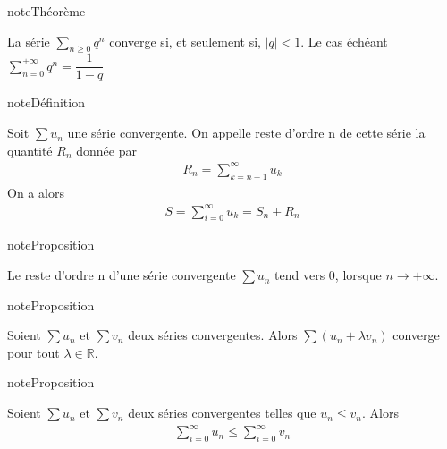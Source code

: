 \documentclass[letterpaper,10pt,french]{sphinxmanual}
\begin{document}
\begin{sphinxadmonition}{note}{Théorème}

\sphinxAtStartPar
La série \(\sum_{n\geq 0}q^n\) converge si, et seulement si, \(|q|<1\). Le cas échéant \(\sum_{n= 0}^{+\infty}q^n=\dfrac{1}{1-q}\)
\end{sphinxadmonition}

\begin{sphinxadmonition}{note}{Définition}

\sphinxAtStartPar
Soit \(\sum u_n\) une série convergente. On appelle reste d’ordre n de cette série
la quantité \(R_n\) donnée par
\begin{equation*}
\begin{split}
R_n = \sum_{k=n+1}^{\infty}u_k
\end{split}
\end{equation*}
\sphinxAtStartPar
On a alors
\begin{equation*}
\begin{split}
S= \sum_{i=0}^{\infty}u_k = S_n + R_n
\end{split}
\end{equation*}\end{sphinxadmonition}

\begin{sphinxadmonition}{note}{Proposition}

\sphinxAtStartPar
Le reste d’ordre n d’une série convergente \(\sum u_n \) tend vers 0, lorsque \(n\to +\infty\).
\end{sphinxadmonition}

\begin{sphinxadmonition}{note}{Proposition}

\sphinxAtStartPar
Soient \(\sum u_n\) et \(\sum v_n\) deux séries convergentes. Alors \(\sum (u_n + \lambda v_n)\) converge pour tout \(\lambda \in \mathbb R\).
\end{sphinxadmonition}

\begin{sphinxadmonition}{note}{Proposition}

\sphinxAtStartPar
Soient \(\sum u_n\) et \(\sum v_n\) deux séries convergentes telles que \(u_n \leq v_n\). Alors
\begin{equation*}
\begin{split}
\sum_{i=0}^\infty u_n \leq \sum_{i=0}^\infty v_n
\end{split}
\end{equation*}\end{sphinxadmonition}
\end{document}
